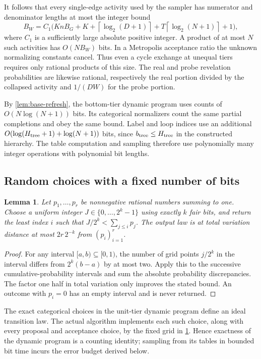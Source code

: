 \documentclass[11pt]{article}
\newtheorem{lemma}[theorem]{Lemma}
\theoremstyle{definition}
\theoremstyle{remark}
\newcommand{\ceil}[1]{\left\lceil#1\right\rceil}
\numberwithin{equation}{section}
\begin{document}
It follows that every single-edge activity used by the sampler has
numerator and denominator lengths at most the integer bound
\begin{equation}\label{eq:edge-bit-bound}
 B_W=C_1\bigl(KnB_G+K+\ceil{\log_2(D+1)}
                       +T\ceil{\log_2(N+1)}+1\bigr),
\end{equation}
where $C_1$ is a sufficiently large absolute positive integer.
A product of at most $N$ such activities has $O(NB_W)$ bits. In a
Metropolis acceptance ratio the unknown normalizing constants cancel.
Thus even a cycle exchange at unequal tiers requires only rational
products of this size. The real and probe revelation probabilities
are likewise rational, respectively the real portion divided by the
collapsed activity and $1/(DW)$ for the probe portion.

By \cref{lem:base-refresh}, the bottom-tier dynamic program uses
counts of $O(N\log(N+1))$ bits. Its categorical normalizers count
the same partial completions and obey the same bound. Label and loop
indices use an additional
$O(\log(H_{\rm tree}+1)+\log(N+1))$ bits, since
$b_{\rm tree}\le H_{\rm tree}$ in the constructed hierarchy.
The table computation and sampling therefore use polynomially many
integer operations with polynomial bit lengths.

\subsection{Random choices with a fixed number of bits}
\begin{lemma}\label{lem:finite-random-choice}
Let $p_1,\ldots,p_r$ be nonnegative rational numbers summing to one.
Choose a uniform integer $J\in\{0,\ldots,2^k-1\}$ using exactly $k$
fair bits, and return the least index $i$ such that
$J/2^k<\sum_{j\le i}p_j$. The output law is at total variation
distance at most $2r\,2^{-k}$ from $(p_i)_{i=1}^r$.
\end{lemma}
\begin{proof}
For any interval $[a,b)\subseteq[0,1)$, the number of grid points
$j/2^k$ in the interval differs from $2^k(b-a)$ by at most two.
Apply this to the successive cumulative-probability intervals and sum
the absolute probability discrepancies. The factor one half in total
variation only improves the stated bound. An outcome with $p_i=0$
has an empty interval and is never returned.
\end{proof}

The exact categorical choices in the unit-tier dynamic program define
an ideal transition law. The actual algorithm implements each such
choice, along with every proposal and acceptance choice, by the fixed
grid in \cref{lem:finite-random-choice}. Hence exactness of the dynamic
program is a counting identity; sampling from its tables in bounded
bit time incurs the error budget derived below.
\end{document}
